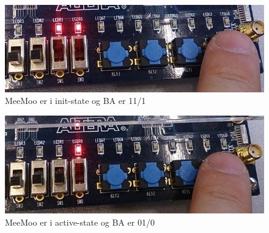 \begin{enumerate}
\begin{figure}[h]
	\centering
	\includegraphics[scale=0.45]{pictures/Oevelse7/opg1/BA111MooMeeINIT.JPG}
	\caption{MeeMoo er i init-state og BA er 11/1}
	\label{fig:BA111MooMeeINIT}
\end{figure}


\begin{figure}[h]
	\centering
	\includegraphics[scale=0.45]{pictures/Oevelse7/opg1/BA010MooMeeACTIVE.JPG}
	\caption{MeeMoo er i active-state og BA er 01/0}
	\label{fig:BA010MooMeeACTIVE}
\end{figure}

\end{enumerate}
	\newpage